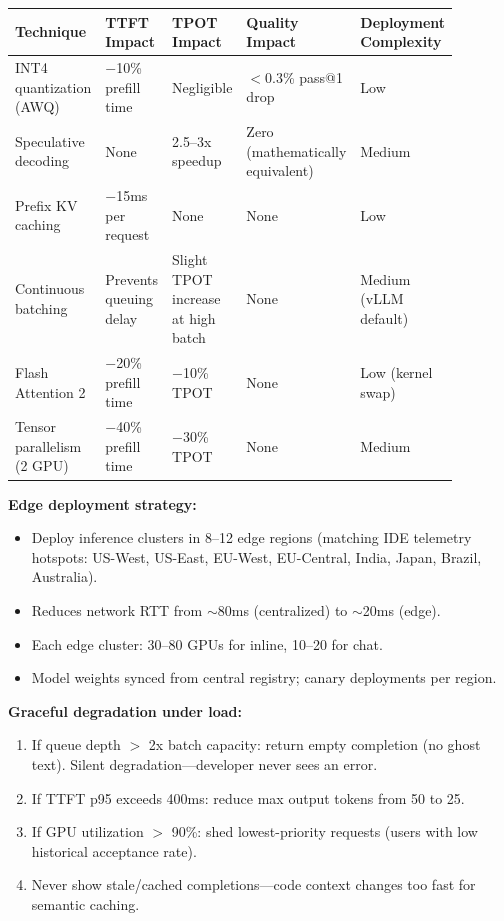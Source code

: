 \begin{tabular}{|p{0.22\linewidth}|p{0.14\linewidth}|p{0.14\linewidth}|p{0.18\linewidth}|p{0.20\linewidth}|}
\hline
\textbf{Technique} & \textbf{TTFT Impact} & \textbf{TPOT Impact} & \textbf{Quality Impact} & \textbf{Deployment Complexity} \\
\hline
INT4 quantization (AWQ) & $-$10\% prefill time & Negligible & $<$0.3\% pass@1 drop & Low \\
\hline
Speculative decoding & None & 2.5--3x speedup & Zero (mathematically equivalent) & Medium \\
\hline
Prefix KV caching & $-$15ms per request & None & None & Low \\
\hline
Continuous batching & Prevents queuing delay & Slight TPOT increase at high batch & None & Medium (vLLM default) \\
\hline
Flash Attention 2 & $-$20\% prefill time & $-$10\% TPOT & None & Low (kernel swap) \\
\hline
Tensor parallelism (2 GPU) & $-$40\% prefill time & $-$30\% TPOT & None & Medium \\
\hline
\end{tabular}

\textbf{Edge deployment strategy:}

\begin{itemize}
  \item Deploy inference clusters in 8--12 edge regions (matching IDE telemetry hotspots: US-West, US-East, EU-West, EU-Central, India, Japan, Brazil, Australia).
  \item Reduces network RTT from $\sim$80ms (centralized) to $\sim$20ms (edge).
  \item Each edge cluster: 30--80 GPUs for inline, 10--20 for chat.
  \item Model weights synced from central registry; canary deployments per region.
\end{itemize}

\textbf{Graceful degradation under load:}

\begin{enumerate}
  \item If queue depth $>$ 2x batch capacity: return empty completion (no ghost text). Silent degradation---developer never sees an error.
  \item If TTFT p95 exceeds 400ms: reduce max output tokens from 50 to 25.
  \item If GPU utilization $>$ 90\%: shed lowest-priority requests (users with low historical acceptance rate).
  \item Never show stale/cached completions---code context changes too fast for semantic caching.
\end{enumerate}

